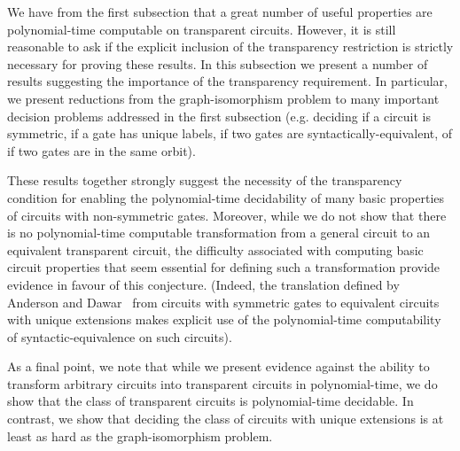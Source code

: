 \documentclass[../paper.tex]{subfiles}
\begin{document}
We have from the first subsection that a great number of useful properties are
polynomial-time computable on transparent circuits. However, it is still
reasonable to ask if the explicit inclusion of the transparency restriction is
strictly necessary for proving these results. In this subsection we present a
number of results suggesting the importance of the transparency requirement. In
particular, we present reductions from the graph-isomorphism problem to many
important decision problems addressed in the first subsection (e.g. deciding if
a circuit is symmetric, if a gate has unique labels, if two gates are
syntactically-equivalent, of if two gates are in the same orbit).

These results together strongly suggest the necessity of the transparency
condition for enabling the polynomial-time decidability of many basic properties
of circuits with non-symmetric gates. Moreover, while we do not show that there
is no polynomial-time computable transformation from a general circuit to an
equivalent transparent circuit, the difficulty associated with computing basic
circuit properties that seem essential for defining such a transformation
provide evidence in favour of this conjecture. (Indeed, the translation defined
by Anderson and Dawar~\cite{AndersonD17} from circuits with symmetric gates to
equivalent circuits with unique extensions makes explicit use of the
polynomial-time computability of syntactic-equivalence on such circuits).

As a final point, we note that while we present evidence against the ability to
transform arbitrary circuits into transparent circuits in polynomial-time, we do
show that the class of transparent circuits is polynomial-time decidable. In contrast, we show
that deciding the class of circuits with unique extensions is at least as hard
as the graph-isomorphism problem.

\end{document}
